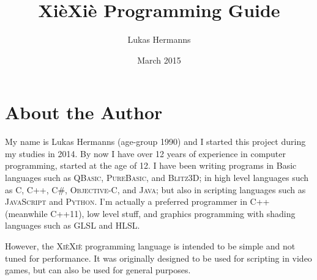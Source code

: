 \documentclass{report}
\title{Xi\`eXi\`e Programming Guide}
\author{Lukas Hermanns}
\date{March 2015}
\begin{document}



\newcommand{\xiexie}{\textsc{Xi\`eXi\`e} }
\newcommand{\xxlang}{\xiexie programming language }
\newcommand{\cpp}{\textsc{C++}}
\newcommand{\java}{\textsc{Java}}
\newcommand{\python}{\textsc{Python}}

\maketitle

\tableofcontents



\chapter*{About the Author}

My name is Lukas Hermanns (age-group 1990) and I started this project during my studies in 2014.
By now I have over 12 years of experience in computer programming, started at the age of 12.
I have been writing programs in Basic languages such as \textsc{QBasic}, \textsc{PureBasic}, and \textsc{Blitz3D};
in high level languages such as \textsc{C}, \textsc{C++}, \textsc{C\#}, \textsc{Objective-C}, and \textsc{Java};
but also in scripting languages such as \textsc{JavaScript} and \textsc{Python}.
I'm actually a preferred programmer in C++ (meanwhile C++11), low level stuff, and graphics programming
with shading languages such as GLSL and HLSL.

However, the \xxlang is intended to be simple and not tuned for performance.
It was originally designed to be used for scripting in video games, but can also be used for
general purposes.


\end{document}
